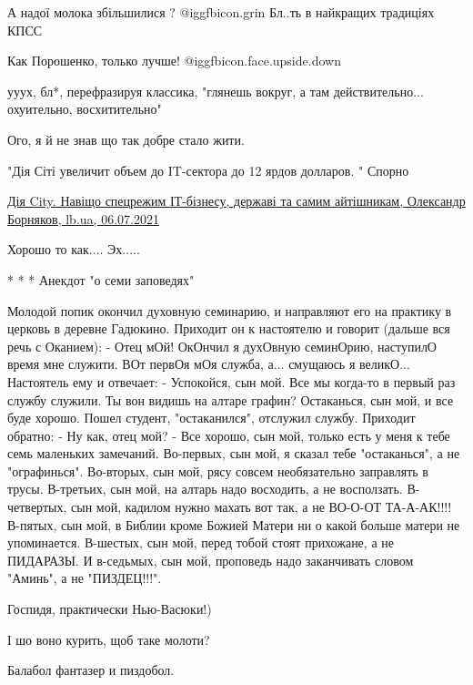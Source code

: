 \begin{itemize}
А надої молока збільшилися ?  @igg{fbicon.grin}  Бл..ть в найкращих традиціях КПСС

Как Порошенко, только лучше!  @igg{fbicon.face.upside.down} 

ууух, бл*, перефразируя классика, "глянешь вокруг, а там действительно... охуительно, восхитительно"

Ого, я й не знав що так добре стало жити.

"Дія Сіті увеличит объем до IT-сектора до 12 ярдов долларов. " Спорно

\href{https://lb.ua/blog/oleksandr_borniakov/488678_diya_city_navishcho_spetsrezhim.html}{%
Дія City. Навіщо спецрежим ІТ-бізнесу, державі та самим айтішникам, Олександр Борняков, lb.ua, 06.07.2021%
}


Хорошо то как.... Эх.....

* * *
Анекдот "о семи заповедях"

\obeycr
Молодой попик окончил духовную семинарию, и направляют его на практику в церковь в деревне Гадюкино.
Приходит он к настоятелю и говорит (дальше вся речь с Оканием):
- Отец мОй! ОкОнчил я духОвную семинОрию, наступилО время мне служити.
ВОт первОя мОя служба, а... смущаюсь я великО...
Настоятель ему и отвечает:
- Успокойся, сын мой. Все мы когда-то в первый раз службу служили. Ты вон
видишь на алтаре графин? Остаканься, сын мой, и все буде хорошо.
Пошел студент, "остаканился", отслужил службу. Приходит обратно:
- Ну как, отец мой?
- Все хорошо, сын мой, только есть у меня к тебе семь маленьких замечаний.
Во-первых, сын мой, я сказал тебе "остаканься", а не "ографинься".
Во-вторых, сын мой, рясу совсем необязательно заправлять в трусы.
В-третьих, сын мой, на алтарь надо восходить, а не восползать.
В-четвертых, сын мой, кадилом нужно махать вот так, а не ВО-О-ОТ ТА-А-АК!!!!
В-пятых, сын мой, в Библии кроме Божией Матери ни о какой больше матери не упоминается.
В-шестых, сын мой, перед тобой стоят прихожане, а не ПИДАРАЗЫ.
И в-седьмых, сын мой, проповедь надо заканчивать словом "Аминь",
а не "ПИЗДЕЦ!!!".
\restorecr


Госпидя, практически Нью-Васюки!)

І шо воно курить, щоб таке молоти?

Балабол фантазер и пиздобол.


\end{itemize}
